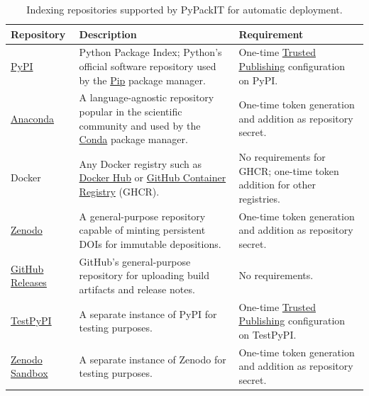 \documentclass{article}
\begin{document}
\begin{table}[h!]
\caption{Indexing repositories supported by PyPackIT for automatic deployment.}
\label{table:indexing-repos}
\begin{tabularx}{\textwidth}{>{\raggedright\arraybackslash}p{2cm} X X}
\toprule
\rowcolor{white}\textbf{Repository} & \textbf{Description} & \textbf{Requirement}\\
\midrule

\href{https://pypi.org/}{PyPI} & Python Package Index; Python's official software repository used by the \href{https://pip.pypa.io/}{Pip} package manager. & One-time \href{https://docs.pypi.org/trusted-publishers/}{Trusted Publishing} configuration on PyPI.\\

\href{https://anaconda.org/}{Anaconda} & A language-agnostic repository popular in the scientific community and used by the \href{https://docs.conda.io}{Conda} package manager. & One-time token generation and addition as repository secret. \\

Docker & Any Docker registry such as \href{https://hub.docker.com/}{Docker Hub} or \href{https://github.blog/news-insights/product-news/introducing-github-container-registry/}{GitHub Container Registry} (GHCR). & No requirements for GHCR; one-time token addition for other registries.\\

\href{https://zenodo.org/}{Zenodo} & A general-purpose repository capable of minting persistent DOIs for immutable depositions. & One-time token generation and addition as repository secret.\\

\href{https://docs.github.com/en/repositories/releasing-projects-on-github/about-releases}{GitHub Releases} & GitHub's general-purpose repository for uploading build artifacts and release notes. & No requirements. \\

\href{https://test.pypi.org/}{TestPyPI} & A separate instance of PyPI for testing purposes. & One-time \href{https://docs.pypi.org/trusted-publishers/}{Trusted Publishing} configuration on TestPyPI.\\

\href{https://sandbox.zenodo.org/}{Zenodo Sandbox} & A separate instance of Zenodo for testing purposes. & One-time token generation and addition as repository secret.\\
\bottomrule
\end{tabularx}
\end{table}
\end{document}
